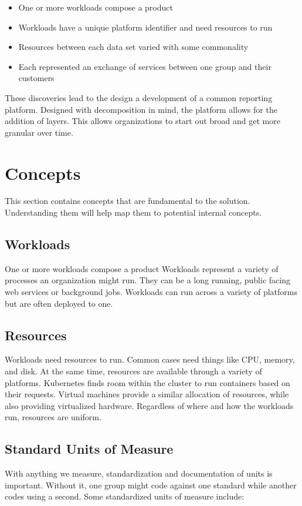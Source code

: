 \documentclass[10pt, a4paper, twocolumn]{article}
\begin{document}
  \begin{itemize}
    \item One or more workloads compose a product
    \item Workloads have a unique platform identifier and need resources to run
    \item Resources between each data set varied with some commonality
    \item Each represented an exchange of services between one group and their customers
  \end{itemize}

  These discoveries lead to the design a development of a common reporting platform.
  Designed with decomposition in mind, the platform allows for the addition of layers.
  This allows organizations to start out broad and get more granular over time.


\section*{Concepts}
  This section contains concepts that are fundamental to the solution.
  Understanding them will help map them to potential internal concepts.

  \subsection*{Workloads}
    One or more workloads compose a product
    Workloads represent a variety of processes an organization might run.
    They can be a long running, public facing web services or background jobs.
    Workloads can run across a variety of platforms but are often deployed to one.

  \subsection*{Resources}
    Workloads need resources to run.
    Common cases need things like CPU, memory, and disk.
    At the same time, resources are available through a variety of platforms.
    Kubernetes finds room within the cluster to run containers based on their requests.
    Virtual machines provide a similar allocation of resources, while also providing virtualized hardware.
    Regardless of where and how the workloads run, resources are uniform.

  \subsection*{Standard Units of Measure}
    With anything we measure, standardization and documentation of units is important.
    Without it, one group might code against one standard while another codes using a second.
    Some standardized units of measure include:
\end{document}
